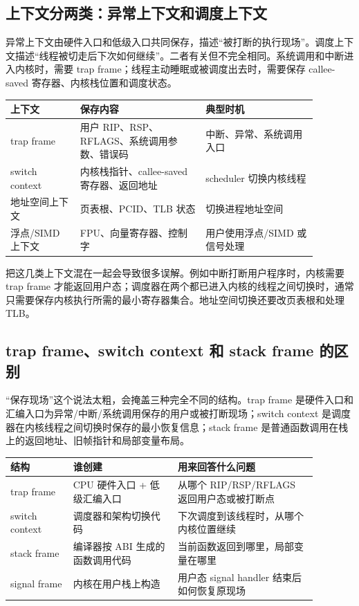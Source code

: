 \subsection{上下文分两类：异常上下文和调度上下文}

异常上下文由硬件入口和低级入口共同保存，描述“被打断的执行现场”。调度上下文描述“线程被切走后下次如何继续”。二者有关但不完全相同。系统调用和中断进入内核时，需要 trap frame；线程主动睡眠或被调度出去时，需要保存 callee-saved 寄存器、内核栈位置和调度状态。

\begin{longtable}{p{0.2\linewidth}p{0.36\linewidth}p{0.32\linewidth}}
\toprule
上下文 & 保存内容 & 典型时机 \\
\midrule
trap frame & 用户 RIP、RSP、RFLAGS、系统调用参数、错误码 & 中断、异常、系统调用入口 \\
switch context & 内核栈指针、callee-saved 寄存器、返回地址 & scheduler 切换内核线程 \\
地址空间上下文 & 页表根、PCID、TLB 状态 & 切换进程地址空间 \\
浮点/SIMD 上下文 & FPU、向量寄存器、控制字 & 用户使用浮点/SIMD 或信号处理 \\
\bottomrule
\end{longtable}

把这几类上下文混在一起会导致很多误解。例如中断打断用户程序时，内核需要 trap frame 才能返回用户态；调度器在两个都已进入内核的线程之间切换时，通常只需要保存内核执行所需的最小寄存器集合。地址空间切换还要改页表根和处理 TLB。

\subsection{trap frame、switch context 和 stack frame 的区别}

“保存现场”这个说法太粗，会掩盖三种完全不同的结构。trap frame 是硬件入口和汇编入口为异常/中断/系统调用保存的用户或被打断现场；switch context 是调度器在内核线程之间切换时保存的最小恢复信息；stack frame 是普通函数调用在栈上的返回地址、旧帧指针和局部变量布局。

\begin{longtable}{p{0.18\linewidth}p{0.30\linewidth}p{0.40\linewidth}}
\toprule
结构 & 谁创建 & 用来回答什么问题 \\
\midrule
trap frame & CPU 硬件入口 + 低级汇编入口 & 从哪个 RIP/RSP/RFLAGS 返回用户态或被打断点 \\
switch context & 调度器和架构切换代码 & 下次调度到该线程时，从哪个内核位置继续 \\
stack frame & 编译器按 ABI 生成的函数调用代码 & 当前函数返回到哪里，局部变量在哪里 \\
signal frame & 内核在用户栈上构造 & 用户态 signal handler 结束后如何恢复原现场 \\
\bottomrule
\end{longtable}

